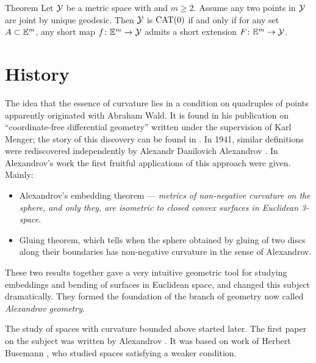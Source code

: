 \begin{thm}{Theorem}
Let $\mathcal{Y}$ be a metric space with and $m\ge 2$.
Assume any two points in $\mathcal{Y}$ are joint by unique geodesic.
Then $\mathcal{Y}$ is $\mathrm{CAT}(0)$ if and only if for any set $A\subset \mathbb{E}^m$, 
any short map $f\colon\mathbb{E}^m\to \mathcal{Y}$ 
admits a short extension $F\colon\mathbb{E}^m\to \mathcal{Y}$.
\end{thm} 


\section{History}

The idea that the essence of curvature lies in a condition on quadruples of points apparently originated with Abraham Wald.
It is found in his publication on ``coordinate-free differential geometry'' \cite{wald} written under the supervision of Karl Menger;
the story of this discovery can be found in \cite{menger}.
In 1941, similar definitions were rediscovered independently by 
Alexandr Danilovich Alexandrov %
\cite{alexandrov:def}.
In Alexandrov's work the first fruitful applications of this approach were given.
Mainly:
\begin{itemize}
\item Alexandrov's embedding theorem --- 
\textit{metrics of non-negative curvature on the sphere, and only they, are isometric to closed convex surfaces in Euclidean 3-space}. 
\item Gluing theorem, which tells  when the sphere obtained by gluing of two discs along their boundaries has non-negative curvature in the sense of Alexandrov.
\end{itemize}
These two results together gave  a very intuitive geometric tool for studying  embeddings and bending of surfaces in  Euclidean space, and changed this subject dramatically.
They formed the foundation of the branch of geometry now called {}\emph{Alexandrov geometry}.

The study of  spaces with curvature bounded above started later.
The first paper on the subject was written by Alexandrov \cite{alexandrov:strong-angle}.
It was based on work of Herbert Busemann \cite{busemann-CBA}, who studied spaces satisfying a weaker condition.
